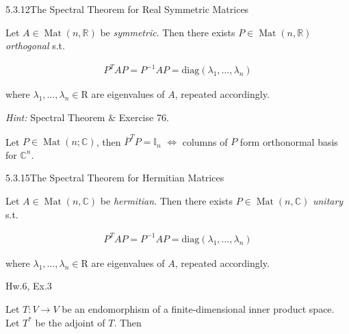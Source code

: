 \documentclass[10pt]{article} %
\DeclareMathOperator{\Mat}{Mat}
\newcommand{\Hint}{\vspace{0.2em}\textit{Hint: }}
\begin{document}
\begin{multicols}{3}
\begin{exercise}{76}{}
\end{exercise}

\begin{corollary}{5.3.12}{The Spectral Theorem for Real Symmetric Matrices}

    Let $A \in \Mat(n,\mathbb{R})$ be \emph{symmetric}. Then there exists $P \in \Mat(n,\mathbb{R})$ \emph{orthogonal} s.t.

        \begin{align*}
            P^TAP = P^{-1}AP = \mathrm{diag}(\lambda_1,\hdots,\lambda_n)
        \end{align*}

    where $\lambda_1,\hdots,\lambda_n \in \mathrm{R}$ are eigenvalues of $A$, repeated accordingly.

    \Hint Spectral Theorem \& Exercise 76.

\end{corollary}

\begin{exercise}{78}{}

    Let $P \in \Mat(n;\mathbb{C})$, then $\overline{P}^T P = \mathbb{I}_n$ $\Leftrightarrow$ columns of $P$ form orthonormal basis for $\mathbb{C}^n$.

\end{exercise}

\begin{corollary}{5.3.15}{The Spectral Theorem for Hermitian Matrices}

    Let $A \in \Mat(n,\mathbb{C})$ be \emph{hermitian}. Then there exists $P \in \Mat(n,\mathbb{C})$ \emph{unitary} s.t.

        \begin{align*}
            P^TAP = P^{-1}AP = \mathrm{diag}(\lambda_1,\hdots,\lambda_n)
        \end{align*}

    where $\lambda_1,\hdots,\lambda_n \in \mathrm{R}$ are eigenvalues of $A$, repeated accordingly.

\end{corollary}

\begin{exercise}{Hw.6, Ex.3}{}

    Let $T: V \to V$ be an endomorphism of a finite-dimensional inner product space. Let $T^*$ be the adjoint of $T$. Then


\end{exercise}
\end{multicols}
\end{document}
